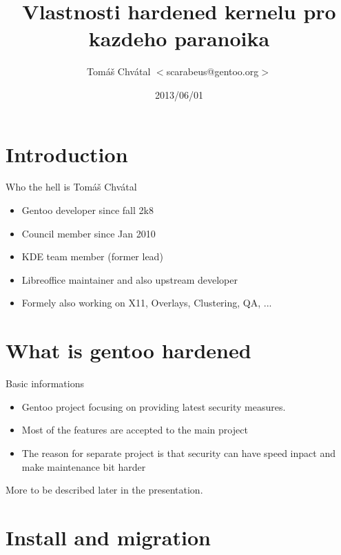 \documentclass{beamer}
\title{Vlastnosti hardened kernelu pro kazdeho paranoika}
\author[Tomáš Chvátal]{Tomáš Chvátal $<$scarabeus@gentoo.org$>$}
\date{2013/06/01}
\begin{document}
\frame{\titlepage}
\section{Introduction}
\begin{frame}{Who the hell is Tomáš Chvátal}
	\begin{itemize}
		\item Gentoo developer since fall 2k8
		\item Council member since Jan 2010
		\item KDE team member (former lead)
		\item Libreoffice maintainer and also upstream developer
		\item Formely also working on X11, Overlays, Clustering, QA, ...
	\end{itemize}
\end{frame}
\section{What is gentoo hardened}

\begin{frame}{Basic informations}
	\begin{itemize}
		\item Gentoo project focusing on providing latest security measures.
		\item Most of the features are accepted to the main project
		\item The reason for separate project is that security can have speed inpact and make maintenance bit harder
	\end{itemize}
	\begin{center}More to be described later in the presentation.\end{center}
\end{frame}

\section{Install and migration}
\end{document}
